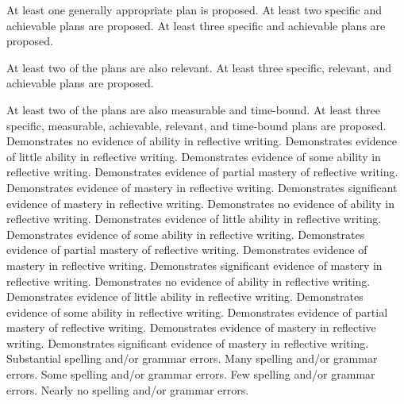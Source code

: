 \documentclass{../fal_assignment}
\begin{document}
\begin{markingrubric}
        \grade 		At least one generally appropriate plan is proposed.
        \grade 		At least two specific and achievable plans are proposed. 
        \grade 		At least three specific and achievable plans are proposed. 
        \par 		At least two of the plans are also relevant.
        \grade 		At least three specific, relevant, and achievable plans are proposed. 
        \par 		At least two of the plans are also measurable and time-bound.
        \grade 		At least three specific, measurable, achievable, relevant, and time-bound plans are proposed. 
%
        \grade\fail 	Demonstrates no evidence of ability in reflective writing.
        \grade 		Demonstrates evidence of little ability in reflective writing.
        \grade 		Demonstrates evidence of some ability in reflective writing.  
        \grade 		Demonstrates evidence of partial mastery of reflective writing.
        \grade 		Demonstrates evidence of mastery in reflective writing.
        \grade 		Demonstrates significant evidence of mastery in reflective writing.
%
        \grade\fail 	Demonstrates no evidence of ability in reflective writing.
        \grade 		Demonstrates evidence of little ability in reflective writing.
        \grade 		Demonstrates evidence of some ability in reflective writing.  
        \grade 		Demonstrates evidence of partial mastery of reflective writing.
        \grade 		Demonstrates evidence of mastery in reflective writing.
        \grade 		Demonstrates significant evidence of mastery in reflective writing.
%
        \grade\fail 	Demonstrates no evidence of ability in reflective writing.
        \grade 		Demonstrates evidence of little ability in reflective writing.
        \grade 		Demonstrates evidence of some ability in reflective writing.  
        \grade 		Demonstrates evidence of partial mastery of reflective writing.
        \grade 		Demonstrates evidence of mastery in reflective writing.
        \grade 		Demonstrates significant evidence of mastery in reflective writing.
%
        \grade\fail 	Substantial spelling and/or grammar errors.
        \grade 		Many spelling and/or grammar errors.
        \grade 		Some spelling and/or grammar errors.  
        \grade 		Few spelling and/or grammar errors.
        \grade 		Nearly no spelling and/or grammar errors.

\end{markingrubric}
\end{document}
